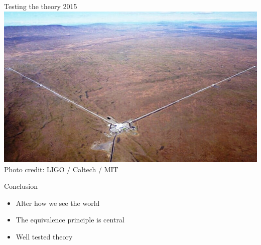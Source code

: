 \documentclass{beamer}
\begin{document}
\begin{frame}{Testing the theory 2015}
  \includegraphics[width=\textwidth]{fig/LIGO}\\{\tiny
  Photo credit: LIGO / Caltech / MIT}
\end{frame}




\begin{frame}{Conclusion}
  \begin{itemize}
  \item{Alter how we see the world}
  \item{The equivalence principle is central}
   \item{Well tested theory}
  \end{itemize}
\end{frame}
\end{document}
